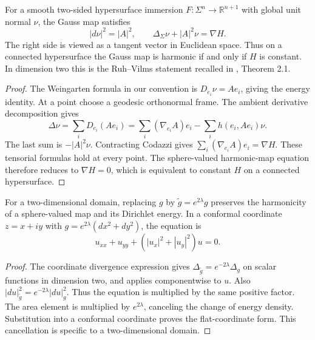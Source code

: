 \begin{proposition}\label{prop:gauss-map-tension}
For a smooth two-sided hypersurface immersion $F:\Sigma^n\to\mathbb R^{n+1}$ with global unit normal $\nu$, the Gauss map satisfies
\[
 |d\nu|^2=|A|^2,\qquad
 \Delta_\Sigma\nu+|A|^2\nu=\nabla H.
\]
The right side is viewed as a tangent vector in Euclidean space. Thus on a connected hypersurface the Gauss map is harmonic if and only if $H$ is constant. In dimension two this is the Ruh--Vilms statement recalled in \cite{Hel01}, Theorem 2.1.
\end{proposition}
\begin{proof}
The Weingarten formula in our convention is $D_{e_i}\nu=Ae_i$, giving the energy identity. At a point choose a geodesic orthonormal frame. The ambient derivative decomposition gives
\[
 \Delta\nu=\sum_i D_{e_i}(Ae_i)
 =\sum_i(\nabla_{e_i}A)e_i-\sum_i h(e_i,Ae_i)\nu.
\]
The last sum is $-|A|^2\nu$. Contracting Codazzi gives $\sum_i(\nabla_{e_i}A)e_i=\nabla H$. These tensorial formulas hold at every point. The sphere-valued harmonic-map equation therefore reduces to $\nabla H=0$, which is equivalent to constant $H$ on a connected hypersurface.
\end{proof}

\begin{lemma}\label{lem:surface-harmonic-conformal-invariance}
For a two-dimensional domain, replacing $g$ by $\widetilde g=e^{2\lambda}g$ preserves the harmonicity of a sphere-valued map and its Dirichlet energy. In a conformal coordinate $z=x+iy$ with $g=e^{2\lambda}(dx^2+dy^2)$, the equation is
\[
 u_{xx}+u_{yy}+(|u_x|^2+|u_y|^2)u=0.
\]
\end{lemma}
\begin{proof}
The coordinate divergence expression gives $\Delta_{\widetilde g}=e^{-2\lambda}\Delta_g$ on scalar functions in dimension two, and applies componentwise to $u$. Also $|du|_{\widetilde g}^2=e^{-2\lambda}|du|_g^2$. Thus the equation is multiplied by the same positive factor. The area element is multiplied by $e^{2\lambda}$, canceling the change of energy density. Substitution into a conformal coordinate proves the flat-coordinate form. This cancellation is specific to a two-dimensional domain.
\end{proof}

